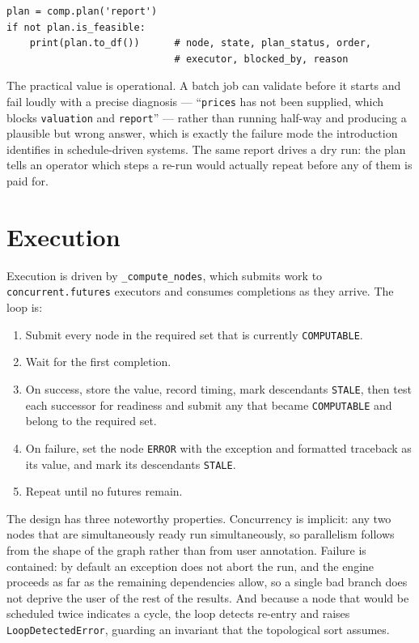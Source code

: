 \documentclass[11pt,a4paper]{article}
\newcommand{\code}[1]{\texttt{#1}}
\begin{document}
\begin{lstlisting}
plan = comp.plan('report')
if not plan.is_feasible:
    print(plan.to_df())      # node, state, plan_status, order,
                             # executor, blocked_by, reason
\end{lstlisting}

The practical value is operational. A batch job can validate before it starts
and fail loudly with a precise diagnosis --- ``\code{prices} has not been
supplied, which blocks \code{valuation} and \code{report}'' --- rather than
running half-way and producing a plausible but wrong answer, which is exactly
the failure mode the introduction identifies in schedule-driven systems. The
same report drives a dry run: the plan tells an operator which steps a re-run
would actually repeat before any of them is paid for.

\section{Execution}\label{sec:exec}

Execution is driven by \code{\_compute\_nodes}, which submits work to
\code{concurrent.futures} executors and consumes completions as they arrive.
The loop is:

\begin{enumerate}
  \item Submit every node in the required set that is currently
  \code{COMPUTABLE}.
  \item Wait for the first completion.
  \item On success, store the value, record timing, mark descendants
  \code{STALE}, then test each successor for readiness and submit any that
  became \code{COMPUTABLE} and belong to the required set.
  \item On failure, set the node \code{ERROR} with the exception and formatted
  traceback as its value, and mark its descendants \code{STALE}.
  \item Repeat until no futures remain.
\end{enumerate}

The design has three noteworthy properties. Concurrency is implicit: any two
nodes that are simultaneously ready run simultaneously, so parallelism follows
from the shape of the graph rather than from user annotation. Failure is
contained: by default an exception does not abort the run, and the engine
proceeds as far as the remaining dependencies allow, so a single bad branch
does not deprive the user of the rest of the results. And because a node that
would be scheduled twice indicates a cycle, the loop detects re-entry and
raises \code{LoopDetectedError}, guarding an invariant that the topological sort
assumes.
\end{document}
